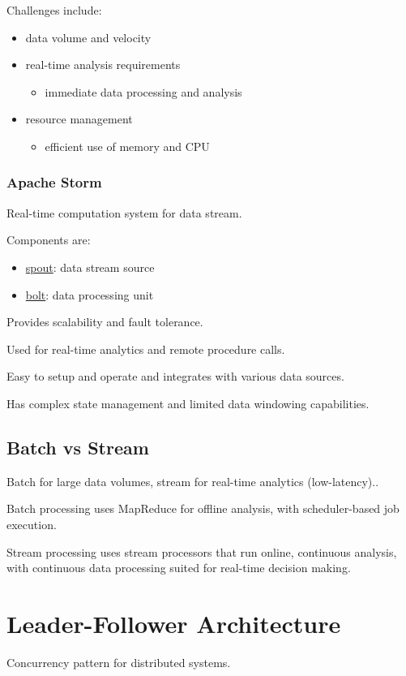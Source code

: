 \documentclass[11pt]{article}
\begin{document}
Challenges include:
\begin{itemize}
\item data volume and velocity
\item real-time analysis requirements
\begin{itemize}
\item immediate data processing and analysis
\end{itemize}
\item resource management
\begin{itemize}
\item efficient use of memory and CPU
\end{itemize}
\end{itemize}
\subsubsection{Apache Storm}
\label{sec:orgaa566f9}
Real-time computation system for data stream.

Components are:
\begin{itemize}
\item \uline{spout}: data stream source
\item \uline{bolt}: data processing unit
\end{itemize}

Provides scalability and fault tolerance.

Used for real-time analytics and remote procedure calls.

Easy to setup and operate and integrates with various data sources.

Has complex state management and limited data windowing
capabilities.
\subsection{Batch vs Stream}
\label{sec:orgd3f6f94}
Batch for large data volumes,
stream for real-time analytics (low-latency)..

Batch processing uses MapReduce for offline analysis, with
scheduler-based job execution.

Stream processing uses stream processors that run online, continuous
analysis, with continuous data processing suited for real-time
decision making.
\section{Leader-Follower Architecture}
\label{sec:org9556da7}
Concurrency pattern for distributed systems.
\end{document}

